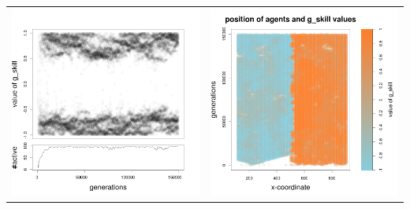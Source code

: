 \documentclass[a4paper,10pt]{article}
\begin{document}
\begin{table}[ht]
\begin{tabular}{cc}
 \newline
 \includegraphics[width=\imgSize]{images/5StaticEnv/Gplot66_staticEnv2}&\includegraphics[width=\imgSize]{images/5StaticEnv/Gplot66Static_staticEnv2}\\

\end{tabular}
\end{table}
\end{document}
